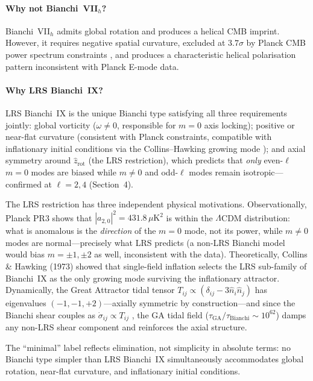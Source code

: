 \documentclass[12pt]{article}
\begin{document}
\paragraph{Why not Bianchi~VII$_h$?}
Bianchi~VII$_h$ admits global rotation and produces a helical CMB imprint.
However, it requires negative spatial curvature, excluded at $3.7\sigma$ by Planck
CMB power spectrum constraints \citep{Jaffe2005}, and produces a characteristic
helical polarisation pattern inconsistent with Planck E-mode data.

\paragraph{Why LRS Bianchi~IX?}
LRS Bianchi~IX is the unique Bianchi type satisfying all three requirements
jointly: global vorticity ($\omega\neq0$, responsible for $m=0$ axis locking);
positive or near-flat curvature (consistent with Planck constraints, compatible
with inflationary initial conditions via the Collins--Hawking growing mode
\citep{CollinsHawking1973, Pontzen2009}); and axial symmetry around
$\hat{z}_\mathrm{rot}$ (the LRS restriction), which predicts that \emph{only}
even-$\ell$ $m=0$ modes are biased while $m\neq0$ and odd-$\ell$ modes remain
isotropic---confirmed at $\ell=2,4$ (Section~4).

The LRS restriction has three independent physical motivations.
Observationally, Planck PR3 shows that $|a_{2,0}|^2=431.8\,\mu\mathrm{K}^2$
is within the $\Lambda$CDM distribution: what is anomalous is the
\emph{direction} of the $m=0$ mode, not its power, while $m\neq0$ modes are
normal---precisely what LRS predicts (a non-LRS Bianchi model would bias
$m=\pm1,\pm2$ as well, inconsistent with the data).
Theoretically, Collins \& Hawking (1973) showed that single-field inflation
selects the LRS sub-family of Bianchi~IX as the only growing mode surviving
the inflationary attractor.
Dynamically, the Great Attractor tidal tensor $T_{ij}\propto(\delta_{ij}-3\hat{n}_i\hat{n}_j)$
has eigenvalues $(-1,-1,+2)$---axially symmetric by construction---and since
the Bianchi shear couples as $\dot{\sigma}_{ij}\propto T_{ij}$ \citep{Pontzen2009},
the GA tidal field ($\tau_\mathrm{GA}/\tau_\mathrm{Bianchi}\sim10^{62}$) damps
any non-LRS shear component and reinforces the axial structure.

The ``minimal'' label reflects elimination, not simplicity in absolute terms:
no Bianchi type simpler than LRS Bianchi~IX simultaneously accommodates global
rotation, near-flat curvature, and inflationary initial conditions.
\end{document}
